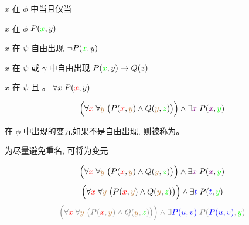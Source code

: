 \begin{frame}{}
  \begin{definition}
    $x$ 在 $\phi$ 中当且仅当
    \begin{description}
      \item[$\phi$ 是原子公式:]
        $x$ 在 $\phi$ 
        \hfill $P(\textcolor{green}{x}, y)$
      \item[$\phi = \lnot\psi$:]
        $x$ 在 $\psi$ {自由出现}
        \hfill $\lnot P(\textcolor{green}{x}, y)$
      \item[$\phi = \psi \ast \gamma$:]
        $x$ 在 $\psi$ 或 $\gamma$ 中{自由出现}
        \hfill $P(\textcolor{green}{x}, y) \to Q(z)$
      \item[$\phi = \forall/\exists y\; \psi$:]
        $x$ 在 $\psi$  且 。
        \hfill $\forall x\; P(\textcolor{red}{x}, y)$
    \end{description}
  \end{definition}

  \pause
  \[
    \Big(\forall \textcolor{red}{x}\; \forall \textcolor{brown}{y}\; \big(P(\textcolor{red}{x}, \textcolor{brown}{y})
      \land Q(\textcolor{brown}{y}, \textcolor{green}{z})\big)\Big) \land
      \exists \textcolor{violet}{x}\; P(\textcolor{violet}{x}, \textcolor{green}{y})
  \]

  \pause
  \vspace{0.50cm}
  \begin{definition}
    在 $\phi$ 中出现的变元如果不是自由出现, 则被称为。
  \end{definition}
\end{frame}

\begin{frame}{}
  \begin{definition}[改名 (Rename)]
    为尽量避免重名, 可将为变元
  \end{definition}

  \pause

  \pause
  \[
    \Big(\forall \textcolor{red}{x}\; \forall \textcolor{brown}{y}\; \big(P(\textcolor{red}{x}, \textcolor{brown}{y})
      \land Q(\textcolor{brown}{y}, \textcolor{green}{z})\big)\Big) \land
      \exists \textcolor{violet}{x}\; P(\textcolor{violet}{x}, \textcolor{green}{y})
  \]
  \pause
  \[
    \Big(\forall \textcolor{red}{x}\; \forall \textcolor{brown}{y}\; \big(P(\textcolor{red}{x}, \textcolor{brown}{y})
      \land Q(\textcolor{brown}{y}, \textcolor{green}{z})\big)\Big) \land
      \exists \textcolor{blue}{t}\; P(\textcolor{blue}{t}, \textcolor{green}{y})
  \]
  \pause
  \[
    \gray{\Big(\forall \red{x}\; \forall \brown{y}\; \big(P(\red{x}, \brown{y})
      \land Q(\brown{y}, \green{z})\big)\Big) \land
      \exists \blue{P(u, v)}\; P(\blue{P(u, v)}, \green{y})}
  \]
\end{frame}

